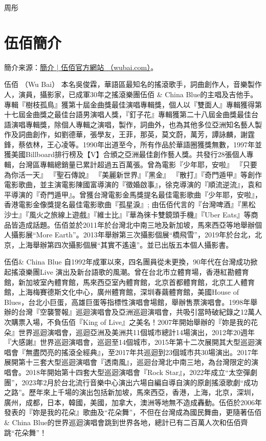 \documentclass[UTF8,a4paper,oneside,twocolumn,12pt]{ctexbook}
\begin{document}
\begin{flushright}
	周彤
\end{flushright}

\chapter*{伍佰簡介}
簡介来源：\href{http://wubai.com/biography/%e7%b0%a1%e4%bb%8b/}{簡介 | 伍佰官方網站 （wubai.com）}。

伍佰 （Wu Bai）
本名吳俊霖，華語區最知名的搖滾歌手，詞曲創作人，音樂製作人，演員，攝影家，已成軍30年之搖滾樂團伍佰 \& China Blue的主唱及吉他手。專輯『樹枝孤鳥』獲第十屆金曲獎最佳演唱專輯獎，個人以『雙面人』專輯獲得第十七屆金曲獎之最佳台語男演唱人獎，『釘子花』專輯獲第二十八屆金曲獎最佳台語演唱專輯獎，除個人專輯之演唱，製作，詞曲外，也為其他多位亞洲知名藝人製作及詞曲創作，如劉德華，張學友，王菲，那英，莫文蔚，萬芳，譚詠麟，謝霆鋒，蔡依林，王心凌等。1990年出道至今，所有作品於華語圈獲獎無數，1997年並獲美國Billboard排行榜及【V】合頒之亞洲最佳創作藝人獎。共發行28張個人專輯，台灣區專輯總銷量已累計超過五百萬張。曾為電影『少年耶，安啦』 『只要為你活一天』 『聖石傳說』 『美麗新世界』『黑金』 『散打』『奇門遁甲』等創作電影歌曲，並主演電影陳國富導演的『徵婚啟事』，徐克導演的『順流逆流』，袁和平導演的『奇門遁甲』。曾獲台灣電影金馬獎提名最佳電影歌曲『少年耶，安啦』，香港電影金像獎提名最佳電影歌曲『孤星淚』; 由伍佰代言的『台灣啤酒』『黑松沙士』『風火之旅線上遊戲』『維士比』『華為徠卡雙鏡頭手機』『Uber Eats』等商品皆造成話題。伍佰並於2011年於台灣北中南三地及新加坡，馬來西亞等地舉辦個人攝影展“More Earth”。2013年舉辦第三次攝影個展“橋飛雪”，2019年於台北，北京，上海舉辦第四次攝影個展“其實不遙遠”。並已出版五本個人攝影書。

伍佰\& China Blue 自1992年成軍以來，四名團員從未更換，90年代在台灣成功掀起搖滾樂團Live 演出及新台語歌的風潮。曾在台北市立體育場，香港紅勘體育館，新加坡室內體育館，馬來西亞室內體育館，北京首都體育館，北京工人體育館，上海梅賽德斯文化中心，廣州體育館，深圳春繭體育館，美國House of Blues，台北小巨蛋，高雄巨蛋等指標性演唱會場館，舉辦售票演唱會。1998年舉辦的台灣『空襲警報』巡迴演唱會及亞洲巡迴演唱會，共吸引當時破紀錄之12萬人次購票入場，不負伍佰『King of Live』之美名！2007年開始舉辦的『妳是我的花朵』世界巡迴演唱會，巡迴亞洲及美洲共11個城市總計14場演出，2012年20週年『大感謝』世界巡迴演唱會，巡迴至14個城市，2015年第十二次展開其大型巡迴演唱會『無盡閃亮的搖滾全經典』，至2017年共巡迴到23個城市共30場演出。2017年展開第十三套大型巡迴演唱會『透南風』，巡迴台灣北中南三地，為台灣限定的演唱會。2018年開始第十四套大型巡迴演唱會『Rock Star』，2022年成立“太空彈劇團”，2023年2月於台北流行音樂中心演出六場自編自導自演的原創搖滾歌劇“成功之路”。歷年來上千場的演出包括新加坡，馬來西亞，香港，上海，北京，深圳，廣州，成都，日本，韓國，美國，加拿大，澳洲等地無不造成轟動。伍佰於2006年發表的『妳是我的花朵』歌曲及“花朵舞”，不但在台灣成為國民舞曲，更隨著伍佰\& China Blue的世界巡迴演唱會跳到世界各地，總計已有二百萬人次和伍佰齊跳“花朵舞”！
\end{document}
